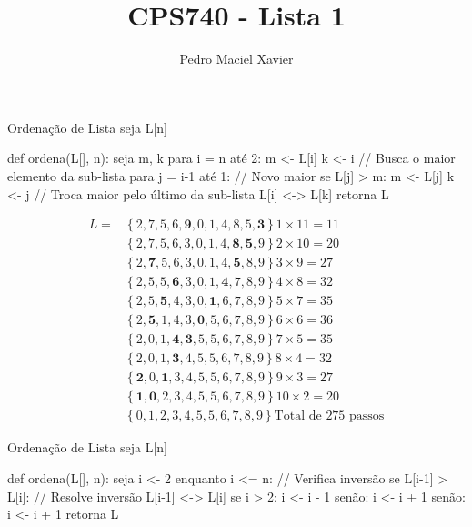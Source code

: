 \documentclass{homework}
\title{CPS740 - Lista 1}
\author{Pedro Maciel Xavier}
\begin{document}
	\maketitle
	
	\quest
	
	
	\subsubquest[Algoritmo]
	
	\begin{algor}{Ordenação de Lista}
	seja L[n]
	
	def ordena(L[], n):
		seja m, k
		para i = n até 2:
			m <- L[i]
			k <- i
			// Busca o maior elemento da sub-lista
			para j = i-1 até 1:
				// Novo maior
				se L[j] > m:
					m <- L[j]
					k <- j
			// Troca maior pelo último da sub-lista
			L[i] <-> L[k]
		retorna L
	\end{algor}

	\begin{align*}
	L = &\left\{2,7,5,6,\mathbf{9},0,1,4,8,5,\mathbf{3}\right\} 1 \times 11 = 11\\
	&\left\{2,7,5,6,3,0,1,4,\mathbf{8},\mathbf{5},9\right\} 2 \times 10 = 20\\
	&\left\{2,\mathbf{7},5,6,3,0,1,4,\mathbf{5},8,9\right\} 3 \times  9 = 27\\
	&\left\{2,5,5,\mathbf{6},3,0,1,\mathbf{4},7,8,9\right\} 4 \times  8 = 32\\
	&\left\{2,5,\mathbf{5},4,3,0,\mathbf{1},6,7,8,9\right\} 5 \times  7 = 35\\
	&\left\{2,\mathbf{5},1,4,3,\mathbf{0},5,6,7,8,9\right\} 6 \times  6 = 36\\
	&\left\{2,0,1,\mathbf{4},\mathbf{3},5,5,6,7,8,9\right\} 7 \times  5 = 35\\
	&\left\{2,0,1,\mathbf{3},4,5,5,6,7,8,9\right\} 8 \times  4 = 32\\
	&\left\{\mathbf{2},0,\mathbf{1},3,4,5,5,6,7,8,9\right\} 9 \times  3 = 27\\
	&\left\{\mathbf{1},\mathbf{0},2,3,4,5,5,6,7,8,9\right\}10 \times  2 = 20\\
	&\left\{0,1,2,3,4,5,5,6,7,8,9\right\} \text{Total de $275$ passos}
	\end{align*}
	
	\newpage
	
	
	\subsubquest[Algoritmo]
	\begin{algor}{Ordenação de Lista}
	seja L[n]
	
	def ordena(L[], n):
		seja i <- 2
		enquanto i <= n:
			// Verifica inversão
			se L[i-1] > L[i]:
				// Resolve inversão
				L[i-1] <-> L[i]
				se i > 2:
					i <- i - 1
				senão:
					i <- i + 1
			senão:
				i <- i + 1
		retorna L
	\end{algor}
\end{document}
